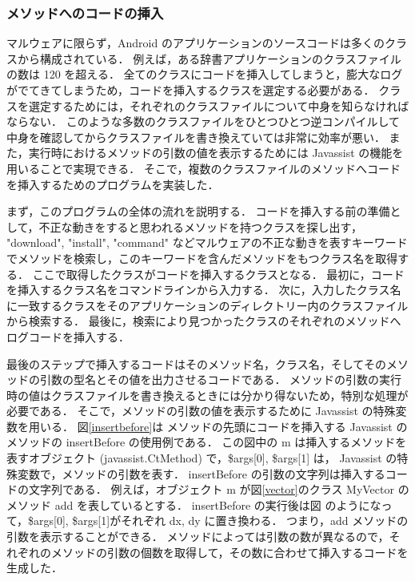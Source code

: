 \subsubsection{メソッドへのコードの挿入}
\label{insertcodes}
マルウェアに限らず，Android のアプリケーションのソースコードは多くのクラスから構成されている．
例えば，ある辞書アプリケーションのクラスファイルの数は 120 を超える．
全てのクラスにコードを挿入してしまうと，膨大なログがでてきてしまうため，コードを挿入するクラスを選定する必要がある．
クラスを選定するためには，それぞれのクラスファイルについて中身を知らなければならない．
このような多数のクラスファイルをひとつひとつ逆コンパイルして中身を確認してからクラスファイルを書き換えていては非常に効率が悪い．
また，実行時におけるメソッドの引数の値を表示するためには Javassist の機能を用いることで実現できる．
そこで，複数のクラスファイルのメソッドへコードを挿入するためのプログラムを実装した．

まず，このプログラムの全体の流れを説明する．
コードを挿入する前の準備として，不正な動きをすると思われるメソッドを持つクラスを探し出す，
"download", "install", "command" などマルウェアの不正な動きを表すキーワードでメソッドを検索し，このキーワードを含んだメソッドをもつクラス名を取得する．
ここで取得したクラスがコードを挿入するクラスとなる．
最初に，コードを挿入するクラス名をコマンドラインから入力する．
次に，入力したクラス名に一致するクラスをそのアプリケーションのディレクトリー内のクラスファイルから検索する．
最後に，検索により見つかったクラスのそれぞれのメソッドへログコードを挿入する．

最後のステップで挿入するコードはそのメソッド名，クラス名，そしてそのメソッドの引数の型名とその値を出力させるコードである．
メソッドの引数の実行時の値はクラスファイルを書き換えるときには分かり得ないため，特別な処理が必要である．
そこで，メソッドの引数の値を表示するために Javassist の特殊変数を用いる．
図\ref{insertbefore}は メソッドの先頭にコードを挿入する Javassist のメソッドの insertBefore の使用例である．
この図中の m は挿入するメソッドを表すオブジェクト (javassist.CtMethod) で，\$args[0], \$args[1] は， Javassist の特殊変数で，メソッドの引数を表す．
insertBefore の引数の文字列は挿入するコードの文字列である．
例えば，オブジェクト m が図\ref{vector}のクラス MyVector のメソッド add を表しているとする．
insertBefore の実行後は図 のようになって，\$args[0], \$args[1]がそれぞれ dx, dy に置き換わる．
つまり，add メソッドの引数を表示することができる．
メソッドによっては引数の数が異なるので，それぞれのメソッドの引数の個数を取得して，その数に合わせて挿入するコードを生成した．

